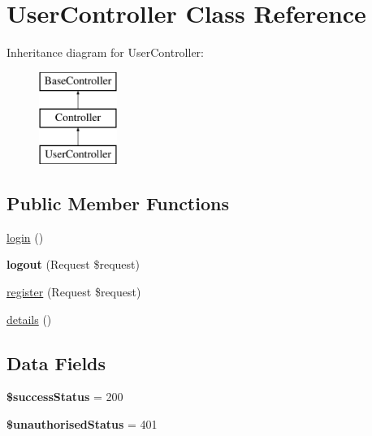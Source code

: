 \hypertarget{class_app_1_1_http_1_1_controllers_1_1_a_p_i_1_1_user_controller}{}\section{User\+Controller Class Reference}
\label{class_app_1_1_http_1_1_controllers_1_1_a_p_i_1_1_user_controller}
Inheritance diagram for User\+Controller\+:\begin{figure}[H]
\begin{center}
\leavevmode
\includegraphics[height=3.000000cm]{class_app_1_1_http_1_1_controllers_1_1_a_p_i_1_1_user_controller}
\end{center}
\end{figure}
\subsection*{Public Member Functions}
\begin{DoxyCompactItemize}
\item 
\mbox{\hyperlink{class_app_1_1_http_1_1_controllers_1_1_a_p_i_1_1_user_controller_aa311da27ba5706f5710cea7706c8eae1}{login}} ()
\item 
\mbox{\label{class_app_1_1_http_1_1_controllers_1_1_a_p_i_1_1_user_controller_a5b2715b64f1825c3c1e3a92ee2b695fc}} 
{\bfseries logout} (Request \$request)
\item 
\mbox{\hyperlink{class_app_1_1_http_1_1_controllers_1_1_a_p_i_1_1_user_controller_ad354167fc268b59819f72a28e6be0987}{register}} (Request \$request)
\item 
\mbox{\hyperlink{class_app_1_1_http_1_1_controllers_1_1_a_p_i_1_1_user_controller_aa0c43d17f37908e525a61168ae0c5b26}{details}} ()
\end{DoxyCompactItemize}
\subsection*{Data Fields}
\begin{DoxyCompactItemize}
\item 
\mbox{\label{class_app_1_1_http_1_1_controllers_1_1_a_p_i_1_1_user_controller_a4fde01aada3b602338d7002a598a8763}} 
{\bfseries \$success\+Status} = 200
\item 
\mbox{\label{class_app_1_1_http_1_1_controllers_1_1_a_p_i_1_1_user_controller_ab7d5fb8f13267c859829854b90c6f50d}} 
{\bfseries \$unauthorised\+Status} = 401
\end{DoxyCompactItemize}


